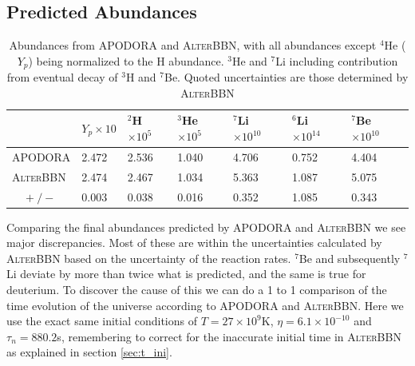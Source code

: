 \subsection{Predicted Abundances}
\begin{table}[ht]
    \begin{tabular}{l|llllll}
        & $Y_p \times 10$ & \hspace{-0.34em}$^{2}$H$ \times 10^{5}$ & \hspace{-0.34em}$^{3}$He$ \times 10^{5}$ & \hspace{-0.34em}$^{7}$Li $ \times 10^{10}$& \hspace{-0.34em}$^{6}$Li $ \times 10^{14}$& \hspace{-0.34em}$^{7}$Be $ \times 10^{10}$\\ \hline
    APODORA & 2.472            & 2.536 & 1.040 & 4.706 & 0.752 & 4.404   \\ \hline
    \textsc{AlterBBN} & 2.474            & 2.467 & 1.034 & 5.363 & 1.087 & 5.075   \\ %
    $\quad +/-$ & 0.003           & 0.038 & 0.016 & 0.352 & 1.085 & 0.343      
    \end{tabular}
    \caption{Abundances from APODORA and \textsc{AlterBBN}, with all abundances except ${}^4$He ($Y_p$) being normalized to the H abundance. ${}^3$He and ${}^7$Li including contribution from eventual decay of ${}^3$H and ${}^7$Be. Quoted uncertainties are those determined by \textsc{AlterBBN}}
    \label{tab:shortAlterabun}
\end{table}
Comparing the final abundances predicted by APODORA and \textsc{AlterBBN} we see major discrepancies. Most of these are within the uncertainties calculated by \textsc{AlterBBN} based on the uncertainty of the reaction rates. ${}^7$Be and subsequently ${}^7$Li deviate by more than twice what is predicted, and the same is true for deuterium. To discover the cause of this we can do a 1 to 1 comparison of the time evolution of the universe according to APODORA and \textsc{AlterBBN}. Here we use the exact same initial conditions of $T=27\times10^9$K, $\eta=6.1\times 10^{-10}$ and $\tau_n=880.2$s, remembering to correct for the inaccurate initial time in \textsc{AlterBBN} as explained in section \ref{sec:t_ini}.

